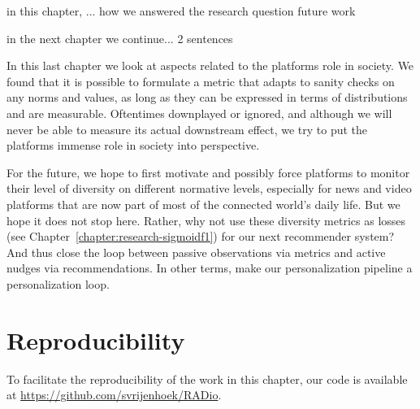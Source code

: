 in this chapter, ...
how we answered the research question
future work

in the next chapter we continue...
2 sentences
\fi

In this last chapter we look at aspects related to the platforms role in society. We found that it is possible to formulate a metric that adapts to sanity checks on any norms and values, as long as they can be expressed in terms of distributions and are measurable. Oftentimes downplayed or ignored, and although we will never be able to measure its actual downstream effect, we try to put the platforms immense role in society into perspective.

For the future, we hope to first motivate and possibly force platforms to monitor their level of diversity on different normative levels, especially for news and video platforms that are now part of most of the connected world's daily life. But we hope it does not stop here. Rather, why not use these diversity metrics as losses (see Chapter~\ref{chapter:research-sigmoidf1}) for our next recommender system? And thus close the loop between passive observations via metrics and active nudges via recommendations. In other terms, make our personalization pipeline a personalization loop.


\section*{Reproducibility}
To facilitate the reproducibility of the work in this chapter, our code is available at \url{https://github.com/svrijenhoek/RADio}.

